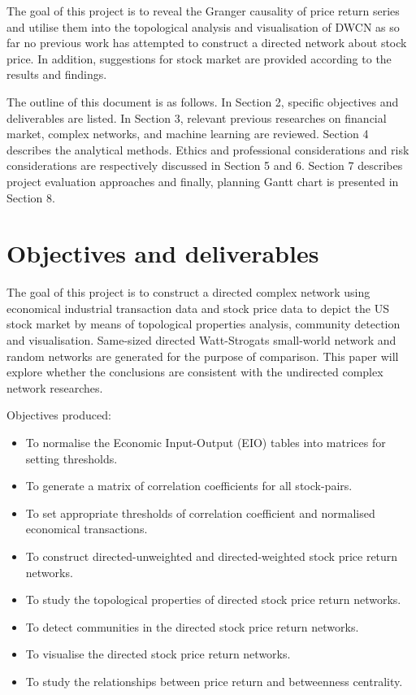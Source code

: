 
The goal of this project is to reveal the Granger causality of price return series and utilise them into the topological analysis and visualisation of DWCN as so far no previous work has attempted to construct a directed network about stock price. In addition, suggestions for stock market are provided according to the results and findings.

The outline of this document is as follows. In Section 2, specific objectives and deliverables are listed. In Section 3, relevant previous researches on financial market, complex networks, and machine learning are reviewed. Section 4 describes the analytical methods. Ethics and professional considerations and risk considerations are respectively discussed in Section 5 and 6. Section 7 describes project evaluation approaches and finally, planning Gantt chart is presented in Section 8.


\section{Objectives and deliverables}

The goal of this project is to construct a directed complex network using economical industrial transaction data and stock price data to depict the US stock market by means of topological properties analysis, community detection and visualisation. Same-sized directed Watt-Strogats small-world network and random networks are generated for the purpose of comparison. This paper will explore whether the conclusions are consistent with the undirected complex network researches.

\vline

Objectives produced:

\begin{itemize}
	\item To normalise the Economic Input-Output (EIO) tables into matrices for setting thresholds.
	\item To generate a matrix of correlation coefficients for all stock-pairs.
	\item To set appropriate thresholds of correlation coefficient and normalised economical transactions.
	\item To construct directed-unweighted and directed-weighted stock price return networks.
	\item To study the topological properties of directed stock price return networks.
	\item To detect communities in the directed stock price return networks.
	\item To visualise the directed stock price return networks.
	\item To study the relationships between price return and betweenness centrality.
\end{itemize}

